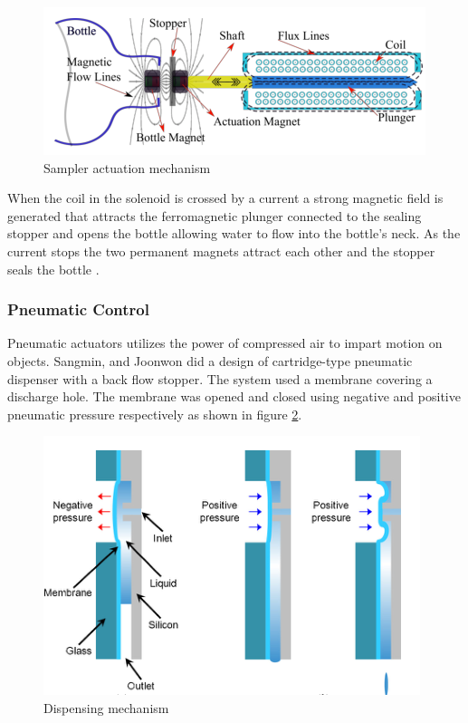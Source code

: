 \begin{figure}
    \centering
    \includegraphics{Figures/stopper.png}
    \caption{Sampler actuation mechanism \cite{odetti2019design}}
    \label{fig:stopper}
\end{figure}

When the coil in the solenoid is crossed by a current a strong magnetic field is generated that attracts the ferromagnetic plunger connected to the sealing stopper and opens the bottle allowing water to flow into the bottle's neck. As the current stops the two permanent magnets attract each other and the stopper seals the bottle \cite{odetti2019design}.

\subsubsection{Pneumatic Control}
Pneumatic actuators utilizes the power of compressed air to impart motion on objects. Sangmin, and Joonwon \cite{lee2009development} did a design of cartridge-type pneumatic dispenser with a back flow stopper. The system used a membrane covering a discharge hole. The membrane was opened and closed using negative and positive pneumatic pressure respectively as shown in figure \ref{fig:dispensing_mechanisml}. 

\begin{figure}
    \centering
    \includegraphics{Figures/dispensing_mechanism.png}
    \caption{Dispensing mechanism \cite{lee2009development}}
    \label{fig:dispensing_mechanisml}
\end{figure}

